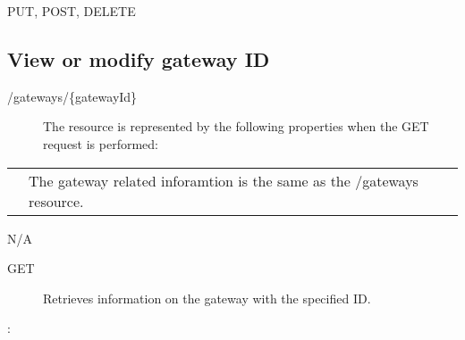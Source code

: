 \documentclass[letterpaper,10pt,english]{sphinxmanual}
\begin{document}
 PUT, POST, DELETE


\subsection{View or modify gateway ID}
\label{\detokenize{restapi:view-or-modify-gateway-id}}
 /gateways/\{gatewayId\}
\begin{description}
\item[{}] \leavevmode
The resource is represented by the following properties when the GET request is performed:

\end{description}


\begin{savenotes}\sphinxattablestart
\centering
\begin{tabulary}{\linewidth}[t]{|T|T|}
\hline

&
\\
\hline
{}
&
The gateway related inforamtion is the same as the /gateways resource.
\\
\hline
\end{tabulary}
\par
\sphinxattableend\end{savenotes}

 N/A
\begin{description}
\item[{ GET}] \leavevmode
Retrieves information on the gateway with the specified ID.

\end{description}

:
\end{document}
